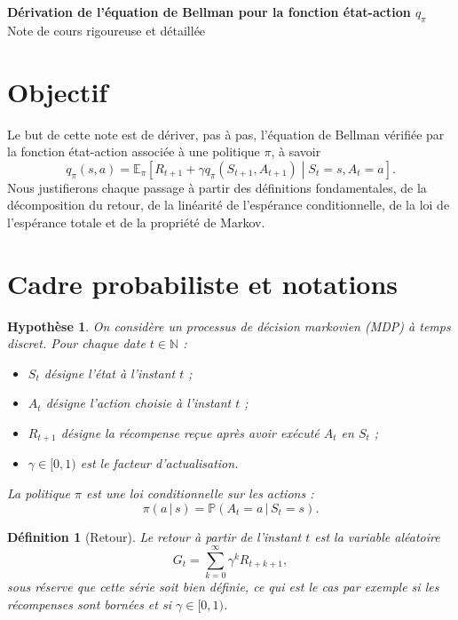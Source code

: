 \documentclass[11pt,a4paper]{article}
\newtheorem*{definition}{Définition}
\newtheorem*{hypothese}{Hypothèse}
\newcommand{\E}{\mathbb{E}}
\newcommand{\Pbb}{\mathbb{P}}
\newcommand{\given}{\,|\,}
\begin{document}
\begin{center}
    {\LARGE\bfseries Dérivation de l'équation de Bellman pour la fonction état-action $q_{\pi}$}\\[0.4em]
    {\large Note de cours rigoureuse et détaillée}
\end{center}

\vspace{0.6em}

\section{Objectif}

Le but de cette note est de dériver, pas à pas, l'équation de Bellman vérifiée par la fonction état-action associée à une politique $\pi$, à savoir
\[
q_{\pi}(s,a) = \E_{\pi}\!\left[R_{t+1} + \gamma q_{\pi}(S_{t+1},A_{t+1}) \middle\vert S_t=s, A_t=a\right].
\]
Nous justifierons chaque passage à partir des définitions fondamentales, de la décomposition du retour, de la linéarité de l'espérance conditionnelle, de la loi de l'espérance totale et de la propriété de Markov.

\section{Cadre probabiliste et notations}

\begin{hypothese}
On considère un processus de décision markovien (MDP) à temps discret. Pour chaque date $t \in \mathbb{N}$ :
\begin{itemize}[leftmargin=1.6em]
    \item $S_t$ désigne l'état à l'instant $t$ ;
    \item $A_t$ désigne l'action choisie à l'instant $t$ ;
    \item $R_{t+1}$ désigne la récompense reçue après avoir exécuté $A_t$ en $S_t$ ;
    \item $\gamma \in [0,1)$ est le facteur d'actualisation.
\end{itemize}
La politique $\pi$ est une loi conditionnelle sur les actions :
\[
\pi(a\given s) = \Pbb(A_t=a \given S_t=s).
\]
\end{hypothese}

\begin{definition}[Retour]
Le retour à partir de l'instant $t$ est la variable aléatoire
\[
G_t = \sum_{k=0}^{\infty} \gamma^k R_{t+k+1},
\]
sous réserve que cette série soit bien définie, ce qui est le cas par exemple si les récompenses sont bornées et si $\gamma \in [0,1)$.
\end{definition}
\end{document}
